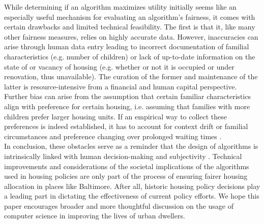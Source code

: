 \documentclass[11pt]{article}
\begin{document}
\newline
While determining if an algorithm maximizes utility initially seems like an especially useful mechanism for evaluating an algorithm’s fairness, it comes with certain drawbacks and limited technical feasibility. The first is that it, like many other fairness measures, relies on highly accurate data. However, inaccuracies can arise through human data entry leading to incorrect documentation of familial characteristics (e.g. number of children) or lack of up-to-date information on the state of or vacancy of housing (e.g. whether or not it is occupied or under renovation, thus unavailable). The curation of the former and maintenance of the latter is resource-intensive from a financial and human capital perspective. \\
\newline
Further bias can arise from the assumption that certain familiar characteristics align with preference for certain housing, i.e. assuming that families with more children prefer larger housing units. If an empirical way to collect these preferences is indeed established, it has to account for context drift or familial circumstances and preference changing over prolonged waiting times \cite{conceptdrift}. \\
\newline
In conclusion, these obstacles serve as a reminder that the design of algorithms is intrinsically linked with human decision-making and subjectivity \cite{humanerror}. Technical improvements and considerations of the societal implications of the algorithms used in housing policies are only part of the process of ensuring fairer housing allocation in places like Baltimore. After all, historic housing policy decisions play a leading part in dictating the effectiveness of current policy efforts. We hope this paper encourages broader and more thoughtful discussion on the usage of computer science in improving the lives of urban dwellers. 


\newpage

 
\end{document}
